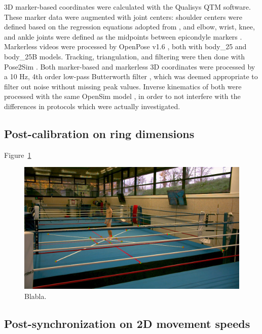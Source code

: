 3D marker-based coordinates were calculated with the Qualisys QTM software. These marker data were augmented with joint centers: shoulder centers were defined based on the regression equations adopted from \cite{Dumas2018}, and elbow, wrist, knee, and ankle joints were defined as the midpoints between epicondyle markers \cite{Pohl2010}. Markerless videos were processed by OpenPose v1.6 \cite{Cao2019}, both with body\_25 and body\_25B models. Tracking, triangulation, and filtering were then done with Pose2Sim \cite{Pagnon2022b}. Both marker-based and markerless 3D coordinates were processed by a 10 Hz, 4th order low-pass Butterworth filter \cite{Butterworth1930}, which was deemed appropriate to filter out noise without missing peak values. Inverse kinematics of both were processed with the same OpenSim model \cite{Pagnon2022b}, in order to not interfere with the differences in protocols which were actually investigated.


\subsection{Post-calibration on ring dimensions}

Figure~\ref{fig_calib}

\begin{figure}[!ht]
	\centering
	\def\svgwidth{1\columnwidth}
	\fontsize{10pt}{10pt}\selectfont
	\includegraphics[width=\linewidth]{"../Chap6/Figures/Fig_Calib.png"}
	\caption{Blabla.}
	\label{fig_calib}
\end{figure}



\subsection{Post-synchronization on 2D movement speeds}

